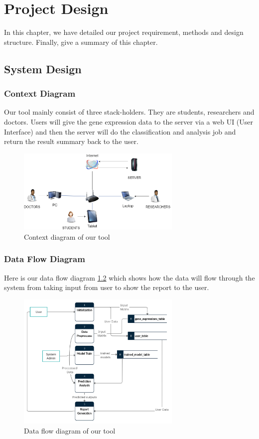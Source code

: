 \chapter{Project Design}
In this chapter, we have detailed our project requirement, methods and design structure. Finally, give a summary of this chapter. 

\section{System Design}
\label{Sys_des}
\subsection{Context Diagram}
Our tool mainly consist of three stack-holders. They are students, researchers and doctors. Users will give the gene expression data to the server via a web UI (User Interface) and then the server will do the classification and analysis job and return the result summary back to the user.
\begin{figure}[H]
    \centering
    \includegraphics[width=0.70\textwidth]{context.png}
    \caption{Context diagram of our tool  }
    \label{fig:contextfig}
\end{figure}
\subsection{Data Flow Diagram}
Here is our data flow diagram \ref{fig:DFDfig} which shows how the data will flow through the system from taking input from user to show the report to the user. 
\begin{figure}[H]
    \centering
    \includegraphics[width=0.70\textwidth]{DFD.png}
    \caption{Data flow diagram of our tool  }
    \label{fig:DFDfig}
\end{figure}
